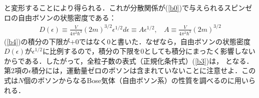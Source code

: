 と変形することにより得られる．これが分散関係が(\ref{b0})で与えられるスピンゼロの自由ボソンの状態密度である：
\begin{align}\label{b6}
D(\epsilon)\equiv
\frac{V}{4\pi^2\hbar^3}(2m)^{3/2}\epsilon^{1/2}d\epsilon\equiv A\epsilon^{1/2},\ \ \ \ A\equiv\frac{V}{4\pi^2\hbar^3}(2m)^{3/2}
\end{align}
(\ref{b4})の積分の下限が$+0$ではなく$0$と書いた．なぜなら，自由ボソンの状態密度$D(\epsilon)$が$\epsilon^{1/2}$に比例するので，積分の下限を0としても積分にまったく影響しないからである．したがって，全粒子数の表式（正規化条件式）(\ref{b3})は，
\be\label{b7}
\ee
となる．第2項の$\epsilon$積分には，運動量ゼロのボソンは含まれていないことに注意せよ．この式は$N$個のボソンからなるBose気体（自由ボソン系）の性質を調べるのに用いられる．




























%

